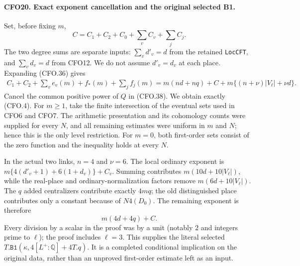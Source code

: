 \paragraph{CFO20. Exact exponent cancellation and the original selected B1.}
\label{claim:CFO20}
Set, before fixing $m$,
\[
                  C=C_1+C_2+C_0+\sum_v C_v+\sum_j C_j.
 \]
The two degree sums are separate inputs:
$\sum_v d'_v=d$ from the retained \texttt{LocCFT},
and $\sum_v d_v=d$ from CFO12.  We do not assume
$d'_v=d_v$ at each place.  Expanding (CFO.36) gives
\[
 \begin{split}
 C_1+C_2+\sum_v e_v(m)+f_\ast(m)+\sum_j f_j(m)
 =m(nd+nq)+C+m\{(n+\nu)|V_\ell|+\nu d\}.
 \end{split}                                                     \tag{CFO.39}
\]
Cancel the common positive power of $Q$ in (CFO.38).
We obtain exactly (CFO.4).
For $m\ge1$, take the finite intersection of the
eventual sets used in CFO6 and CFO7.  The arithmetic
presentation and its cohomology counts were supplied
for every $N$, and all remaining estimates were
uniform in $m$ and $N$; hence this is the only
level restriction.  For $m=0$, both first-order
sets consist of the zero function and the inequality
holds at every $N$.

In the actual two links, $n=4$ and $\nu=6$.
The local ordinary exponent is
$m\{4(d'_v+1)+6(1+d_v)\}+C_v$.
Summing contributes $m(10d+10|V_\ell|)$, while the
real-place and ordinary-normalization factors remove
$m(6d+10|V_\ell|)$.  The $q$ added centralizers
contribute exactly $4mq$; the old distinguished
place contributes only a constant because of $N4(D_0)$.
The remaining exponent is therefore
\[
                            m(4d+4q)+C.                         \tag{CFO.40}
\]
Every division by a scalar in the proof was by a
unit (notably $2$ and integers prime to $\ell$);
the proof includes $\ell=3$.
This supplies the literal selected
$T.\texttt{B1}(\kappa,4[L^+:\mathbb Q]+4T.q)$.
It is a completed conditional implication on the
original data, rather than an unproved first-order
estimate left as an input.

